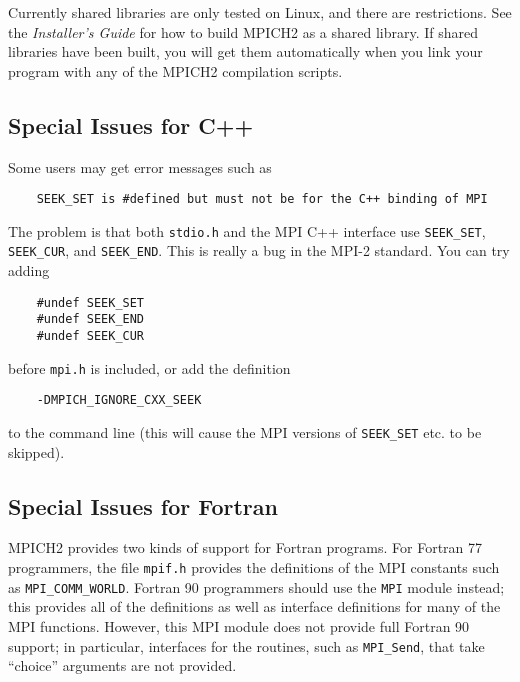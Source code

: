 \documentclass[dvipdfm,11pt]{article}
\begin{document}
Currently shared libraries are only tested on Linux, and there are
restrictions.  See the \emph{Installer's Guide} for how to build MPICH2
as a shared library.  If shared libraries have been built, you will
get them automatically when you link your program with any of the
MPICH2 compilation scripts.

\subsection{Special Issues for C++}
\label{sec:cxx}

Some users may get error messages such as
\begin{verbatim}
    SEEK_SET is #defined but must not be for the C++ binding of MPI
\end{verbatim}
The problem is that both \texttt{stdio.h} and the MPI C++ interface use
\texttt{SEEK\_SET}, \texttt{SEEK\_CUR}, and \texttt{SEEK\_END}.  This is really a bug
in the MPI-2 standard.  You can try adding 
\begin{verbatim}
    #undef SEEK_SET
    #undef SEEK_END
    #undef SEEK_CUR
\end{verbatim}
before \texttt{mpi.h} is included, or add the definition
\begin{verbatim}
    -DMPICH_IGNORE_CXX_SEEK
\end{verbatim}
to the command line (this will cause the MPI versions of \texttt{SEEK\_SET}
etc. to be skipped).

\subsection{Special Issues for Fortran}
\label{sec:fortran}

MPICH2 provides two kinds of support for Fortran programs.  For
Fortran 77 programmers, the file \texttt{mpif.h} provides the
definitions of the MPI constants such as \texttt{MPI\_COMM\_WORLD}.
Fortran 90 programmers should use the \texttt{MPI} module instead;
this provides all of the definitions as well as interface definitions
for many of the MPI functions.  However, this MPI module does not
provide full Fortran 90 support; in particular, interfaces for the
routines, such as \texttt{MPI\_Send}, that take ``choice'' arguments
are not provided.

\end{document}
